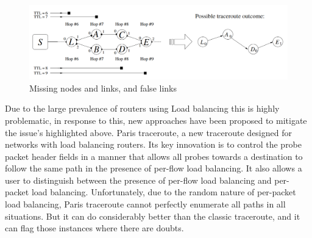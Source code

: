 \begin{figure}[!ht]
  \begin{center}
    \includegraphics[scale=0.3]{images/missing_nodes.png}
    \caption{Missing nodes and links, and false links \cite{anomalies}}
    \label{figure:missing_node_fig}
  \end{center}
\end{figure}



Due to the large prevalence of routers using Load balancing this is highly problematic, in response to this, new approaches have been proposed to mitigate the issue's highlighted above.
Paris traceroute, a new traceroute designed
for networks with load balancing routers. Its key innovation is to control the probe packet header fields in a manner that allows all probes towards a destination to follow the same path in the presence of per-flow load balancing. It also allows a user to distinguish between the presence of per-flow load balancing and per-packet load balancing. Unfortunately, due to the random nature of per-packet load balancing, Paris traceroute cannot perfectly enumerate all paths in all situations. But it can do considerably better than the classic traceroute, and it can flag those instances
where there are doubts. \cite{anomalies}

